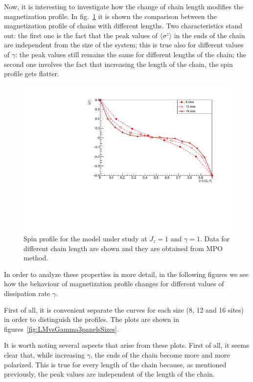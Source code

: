 Now, it is interesting to investigate how the change of chain length modifies the magnetization profile. In fig.~\ref{fig:LM_comparisonVSsizeJz1Gamma1} it is shown the comparison between the magnetization profile of chains with different lengths. Two characteristics stand out: the first one is the fact that the peak values of $\langle\sigma^z\rangle$ in the ends of the chain are independent from the size of the system; this is true also for different values of $\gamma$: the peak values still remains the same for different lengths of the chain; the second one involves the fact that increasing the length of the chain, the spin profile gets flatter.

\begin{figure}[H]
    \centering
    \includegraphics[scale=0.7]{Figures/NORM_LM_comparisonVSsize.pdf}
    \captionsetup{width=1.\linewidth}
    \caption{Spin profile for the model under study at $J_z = 1$ and $\gamma=1$. Data for different chain length are shown and they are obtained from MPO method.}
    \label{fig:LM_comparisonVSsizeJz1Gamma1}
\end{figure}

In order to analyze these properties in more detail, in the following figures we see how the behaviour of magnetization profile changes for different values of dissipation rate $\gamma$. 

First of all, it is convenient separate the curves for each size (8, 12 and 16 sites) in order to distinguish the profiles. The plots are shown in figures~\ref{fig:LMvsGamma3panelsSizes}.

It is worth noting several aspects that arise from these plots. First of all, it seems clear that, while increasing $\gamma$, the ends of the chain become more and more polarized. This is true for every length of the chain because, as mentioned previously, the peak values are independent of the length of the chain.

